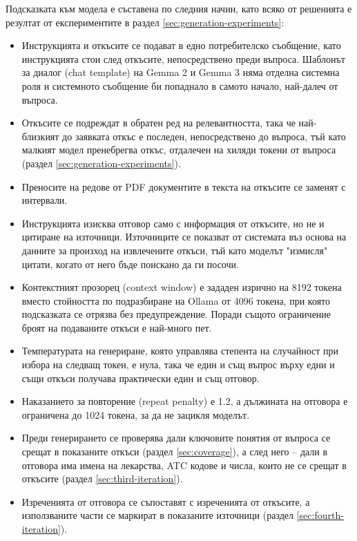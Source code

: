 \documentclass[12pt,a4paper]{article}
\begin{document}
Подсказката към модела е съставена по следния начин, като всяко от решенията е резултат от експериментите в раздел \ref{sec:generation-experiments}:
\begin{itemize}
\item Инструкцията и откъсите се подават в едно потребителско съобщение, като инструкцията стои след откъсите, непосредствено преди въпроса. Шаблонът за диалог (chat template) на Gemma 2 и Gemma 3 няма отделна системна роля и системното съобщение би попаднало в самото начало, най-далеч от въпроса.
\item Откъсите се подреждат в обратен ред на релевантността, така че най-близкият до заявката откъс е последен, непосредствено до въпроса, тъй като малкият модел пренебрегва откъс, отдалечен на хиляди токени от въпроса (раздел \ref{sec:generation-experiments}).
\item Преносите на редове от PDF документите в текста на откъсите се заменят с интервали.
\item Инструкцията изисква отговор само с информация от откъсите, но не и цитиране на източници. Източниците се показват от системата въз основа на данните за произход на извлечените откъси, тъй като моделът "измисля" цитати, когато от него бъде поискано да ги посочи.
\item Контекстният прозорец (context window) е зададен изрично на 8192 токена вместо стойността по подразбиране на Ollama от 4096 токена, при която подсказката се отрязва без предупреждение. Поради същото ограничение броят на подаваните откъси е най-много пет.
\item Температурата на генериране, която управлява степента на случайност при избора на следващ токен, е нула, така че един и същ въпрос върху едни и същи откъси получава практически един и същ отговор.
\item Наказанието за повторение (repeat penalty) е 1.2, а дължината на отговора е ограничена до 1024 токена, за да не зацикля моделът.
\item Преди генерирането се проверява дали ключовите понятия от въпроса се срещат в показаните откъси (раздел \ref{sec:coverage}), а след него -- дали в отговора има имена на лекарства, ATC кодове и числа, които не се срещат в откъсите (раздел \ref{sec:third-iteration}).
\item Изреченията от отговора се съпоставят с изреченията от откъсите, а използваните части се маркират в показаните източници (раздел \ref{sec:fourth-iteration}).
\end{itemize}
\end{document}
